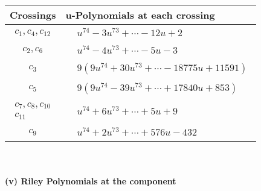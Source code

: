\documentclass[1p]{elsarticle_modified}
\theoremstyle{definition}
\begin{document}
\begin{tabular}{m{50pt}|m{274pt}}
Crossings & \hspace{64pt}u-Polynomials at each crossing \\
\hline $$\begin{aligned}c_{1},c_{4},c_{12}\end{aligned}$$&$\begin{aligned}
&u^{74}-3 u^{73}+\cdots-12 u+2
\end{aligned}$\\
\hline $$\begin{aligned}c_{2},c_{6}\end{aligned}$$&$\begin{aligned}
&u^{74}-4 u^{73}+\cdots-5 u-3
\end{aligned}$\\
\hline $$\begin{aligned}c_{3}\end{aligned}$$&$\begin{aligned}
&9(9 u^{74}+30 u^{73}+\cdots-18775 u+11591)
\end{aligned}$\\
\hline $$\begin{aligned}c_{5}\end{aligned}$$&$\begin{aligned}
&9(9 u^{74}-39 u^{73}+\cdots+17840 u+853)
\end{aligned}$\\
\hline $$\begin{aligned}c_{7},c_{8},c_{10}\\c_{11}\end{aligned}$$&$\begin{aligned}
&u^{74}+6 u^{73}+\cdots+5 u+9
\end{aligned}$\\
\hline $$\begin{aligned}c_{9}\end{aligned}$$&$\begin{aligned}
&u^{74}+2 u^{73}+\cdots+576 u-432
\end{aligned}$\\
\hline
\end{tabular}\\~\\
\newpage\renewcommand{\arraystretch}{1}
\flushleft \textbf{(v) Riley Polynomials at the component}\newline \\
\end{document}
